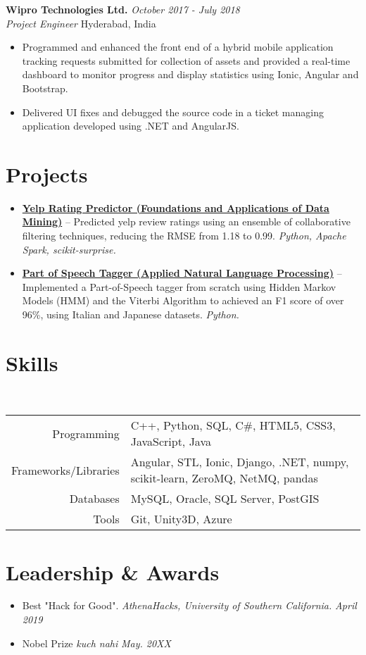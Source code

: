 \documentclass[letterpaper,10pt]{article}
\newcommand{\organization}[4]{
    \vspace{1.5pt}
    \textbf{#1} \hfill{\emph{#2}} \\
    \emph{#3} \hfill{#4} \\
    \vspace{3pt}
}
\newcommand{\pro}[4]{
    \item \href{#2}{\textbf{#1}} -- {#3} \emph{#4}}
\newcommand{\skills}[4]{
    \vspace{-2pt}
    \ \ \ \ \ \ \ \ \ \ \ 
    \begin{tabular}{r!{\color{burgundy}\vrule}l}
          Programming & #1 \\
          Frameworks/Libraries & #2 \\
          Databases & #3 \\
          Tools & #4
    \end{tabular}
    \vspace{4pt}
}
\newcommand{\activity}[3]{
    \item #1 \textit{#2} \hfill{\emph{#3}}      
}
\newcommand{\bulletsBegin}{
    \vspace{1pt}
    \begin{minipage}{17.6cm} 
    \begin{itemize}[leftmargin=0.6cm]
    \setlength\itemsep{-0.009em}
}
\newcommand{\bulletsEnd}{
    \end{itemize}\vspace{0pt}
    \end{minipage}
}
\newcommand{\bulletsBeginn}{
    \vspace{1pt}
    \begin{minipage}{18cm} 
    \begin{itemize}[leftmargin=0.6cm]
}
\newcommand{\bulletsEndd}{
    \end{itemize}\vspace{0pt}
    \end{minipage}
}
\begin{document}
        \organization{Wipro Technologies Ltd.}{October 2017 - July 2018}
        {Project Engineer}{Hyderabad, India}
        \bulletsBegin
            \item Programmed and enhanced the front end of a hybrid mobile application tracking requests submitted for collection of assets and provided a real-time dashboard to monitor progress and display statistics using Ionic, Angular and Bootstrap.
            \item Delivered UI fixes and debugged the source code in a ticket managing application developed using .NET and AngularJS.
        \bulletsEnd

    \section{Projects}

    
        \bulletsBegin
            \vspace{-3pt}
        \pro{Yelp Rating Predictor (Foundations and Applications of Data Mining)}
            {https://github.com/example/project}
            {Predicted yelp review ratings using an ensemble of collaborative filtering techniques, reducing the RMSE from 1.18 to 0.99.}
            {Python, Apache Spark, scikit-surprise.}
        \pro{Part of Speech Tagger (Applied Natural Language Processing)}
            {https://github.com/example/project}
            {Implemented a Part-of-Speech tagger from scratch using Hidden Markov Models (HMM) and the Viterbi Algorithm to achieved an F1 score of over 96\%, using Italian and Japanese datasets.}
            {Python.}
        
        \bulletsEnd

    \section{Skills}
    
    \skills
        {C++, Python, SQL, C\#, HTML5, CSS3, JavaScript, Java}  %
        {Angular, STL, Ionic, Django, .NET, numpy, scikit-learn, ZeroMQ, NetMQ, pandas}  %
        {MySQL, Oracle, SQL Server, PostGIS}  %
        {Git, Unity3D, Azure}  %

    
    \section{Leadership \& Awards}

    \bulletsBeginn
        \activity{Best "Hack for Good".}{AthenaHacks, University of Southern California.}{April 2019}
        \vspace{-4pt}
        \activity{Nobel Prize}{kuch nahi}{May. 20XX}
    \bulletsEndd

\end{document}
